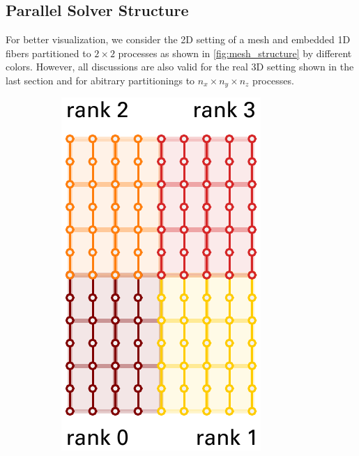 \subsection{Parallel Solver Structure}\label{sec:parallel_partitioning_for_fiber_based_solver}
For better visualization, we consider the 2D setting of a mesh and embedded 1D fibers partitioned to $2\times 2$ processes as shown in \cref{fig:mesh_structure} by different colors. However, all discussions are also valid for the real 3D setting shown in the last section and for abitrary partitionings to $n_x \times n_y \times n_z$ processes.

\begin{figure}%
  \centering%
  \begin{subfigure}[t]{0.30\textwidth}%
    \centering%
    \includegraphics[width=\textwidth]{images/implementation/mesh_structure.pdf}

\end{subfigure}
\end{figure}
